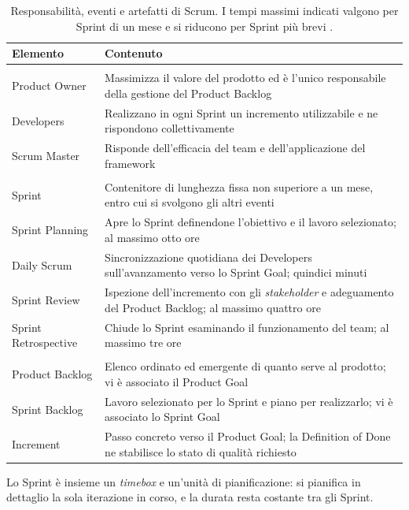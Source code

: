 \begin{table}[!htb]
\centering
\small
\caption{Responsabilit\`a, eventi e artefatti di Scrum. I tempi massimi
indicati valgono per Sprint di un mese e si riducono per Sprint pi\`u brevi
\cite{scrumguide2020}.}
\label{tab:scrum}
\begin{tabularx}{\textwidth}{@{}>{\raggedright\arraybackslash}p{3.4cm}X@{}}
\toprule
\textbf{Elemento} & \textbf{Contenuto} \\
\midrule
\multicolumn{2}{@{}l}{\textbf{Responsabilit\`a}} \\
Product Owner &
Massimizza il valore del prodotto ed \`e l'unico responsabile della gestione
del Product Backlog \\
Developers &
Realizzano in ogni Sprint un incremento utilizzabile e ne rispondono
collettivamente \\
Scrum Master &
Risponde dell'efficacia del team e dell'applicazione del framework \\
\addlinespace
\multicolumn{2}{@{}l}{\textbf{Eventi}} \\
Sprint &
Contenitore di lunghezza fissa non superiore a un mese, entro cui si svolgono
gli altri eventi \\
Sprint Planning &
Apre lo Sprint definendone l'obiettivo e il lavoro selezionato; al massimo otto
ore \\
Daily Scrum &
Sincronizzazione quotidiana dei Developers sull'avanzamento verso lo Sprint
Goal; quindici minuti \\
Sprint Review &
Ispezione dell'incremento con gli \emph{stakeholder} e adeguamento del Product
Backlog; al massimo quattro ore \\
Sprint Retrospective &
Chiude lo Sprint esaminando il funzionamento del team; al massimo tre ore \\
\addlinespace
\multicolumn{2}{@{}l}{\textbf{Artefatti}} \\
Product Backlog &
Elenco ordinato ed emergente di quanto serve al prodotto; vi \`e associato il
Product Goal \\
Sprint Backlog &
Lavoro selezionato per lo Sprint e piano per realizzarlo; vi \`e associato lo
Sprint Goal \\
Increment &
Passo concreto verso il Product Goal; la Definition of Done ne stabilisce lo
stato di qualit\`a richiesto \\
\bottomrule
\end{tabularx}
\end{table}
\newpage

Lo Sprint \`e insieme un \emph{timebox} e un'unit\`a di pianificazione: si
pianifica in dettaglio la sola iterazione in corso, e la durata resta costante
tra gli Sprint.

